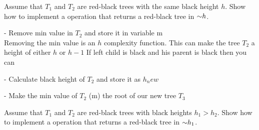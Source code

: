 \begin{problem}
\begin{questions}
\item Assume that $T_1$ and $T_2$ are red-black trees with the same black height $h$. Show how to implement a  operation that returns a red-black tree in $\mathord{\sim}h$.

- Remove min value in $T_2$ and store it in variable m\\
Removing the min value is an $h$ complexity function. This can make the tree $T_2$ a height of either $h$ or $h-1$
If left child is black and his parent is black then you can 

- Calculate black height of $T_2$ and store it as $h_new$


- Make the min value of $T_2$ (m) the root of our new tree $T_3$



\item Assume that $T_1$ and $T_2$ are red-black trees with black heights $h_1 > h_2$. Show how to implement a  operation that returns a red-black tree in $\mathord{\sim}h_1$.



\end{questions}
\end{problem}


